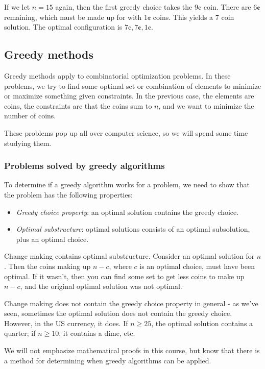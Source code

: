 \documentclass{article}
\begin{document}
If we let $n=15$ again, then the first greedy choice takes the $9\cent$ coin.  There are $6\cent$ remaining, which must be made up for with $1 \cent$ coins.  This yields a 7 coin solution.  The optimal configuration is $7\cent,7\cent,1\cent$.

\subsection{Greedy methods}
Greedy methods apply to combinatorial optimization problems.  In these problems, we try to find some optimal set or combination of elements to minimize or maximize something given constraints.  In the previous case, the elements are coins, the constraints are that the coins sum to $n$, and we want to minimize the number of coins.

These problems pop up all over computer science, so we will spend some time studying them.

\subsubsection{Problems solved by greedy algorithms}

To determine if a greedy algorithm works for a problem, we need to show that the problem has the following properties:

\begin{itemize}
\item \textit{Greedy choice property}: an optimal solution contains the greedy choice.
\item \textit{Optimal substructure}: optimal solutions consists of an optimal subsolution, plus an optimal choice.
\end{itemize}

Change making contains optimal substructure.  Consider an optimal solution for $n$.  Then the coins making up $n-c$, where $c$ is an optimal choice, must have been optimal.  If it wasn't, then you can find some set to get less coins to make up $n-c$, and the original optimal solution was not optimal.

Change making does not contain the greedy choice property in general - as we've seen, sometimes the optimal solution does not contain the greedy choice.  However, in the US currency, it does.  If $n\ge25$, the optimal solution contains a quarter; if $n\ge10$, it contains a dime, etc.

We will not emphasize mathematical proofs in this course, but know that there is a method for determining when greedy algorithms can be applied.
\end{document}
